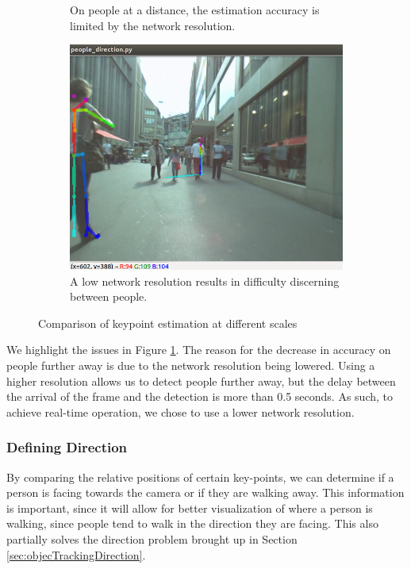 \begin{figure}[ht]
\begin{subfigure}[b]{.32\textwidth}
		\caption{On people at a distance, the estimation accuracy is limited by the network resolution.}
	\end{subfigure}
	\hspace{\fill} 
	\begin{subfigure}[b]{.32\textwidth}
		\centering
		\includegraphics[width=1.0\linewidth]{img/chapter5_implementation/openposeKP2.png}
		\caption{A low network resolution results in difficulty discerning between people.}
	\end{subfigure}
	\vspace{-1\baselineskip}
	\begin{center}
		\caption{Comparison of keypoint estimation at different scales}
		\label{fig:openposeKP}
	\end{center}
		\vspace{-1.5\baselineskip}
\end{figure}

We highlight the issues in Figure \ref{fig:openposeKP}. The reason for the decrease in accuracy on people further away is due to the network resolution being lowered. Using a higher resolution allows us to detect people further away, but the delay between the arrival of the frame and the detection is more than 0.5 seconds. As such, to achieve real-time operation, we chose to use a lower network resolution.

\subsubsection{Defining Direction}
By comparing the relative positions of certain key-points, we can determine if a person is facing towards the camera or if they are walking away. This information is important, since it will allow for better visualization of where a person is walking, since people tend to walk in the direction they are facing. This also partially solves the direction problem brought up in Section \ref{sec:objecTrackingDirection}.

